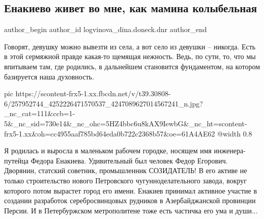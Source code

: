 
 
 
 
 
 
\subsection{Енакиево живет во мне, как мамина колыбельная}
\label{sec:18_11_2021.fb.logvinova_dina.doneck.dnr.1.jenakievo_mamina_kolybeljnaja}
 
\ifcmt
 author_begin
   author_id logvinova_dina.doneck.dnr
 author_end
\fi

Говорят, девушку можно вывезти из села, а вот село из девушки – никогда. Есть в
этой сермяжной правде какая-то щемящая нежность. Ведь, по сути, то, что мы
впитываем там, где родились, в дальнейшем становится фундаментом, на котором
базируется наша духовность. 

\ifcmt
  pic https://scontent-frx5-1.xx.fbcdn.net/v/t39.30808-6/257952744_4252226471570537_4247089627014567241_n.jpg?_nc_cat=111&ccb=1-5&_nc_sid=730e14&_nc_ohc=5HZ4bbc6u8kAX9IewbG&_nc_ht=scontent-frx5-1.xx&oh=cc4955aaf785bd64eda0b722c2368b57&oe=61A4AE62
  @width 0.8
\fi

Я родилась и выросла в маленьком рабочем городке, носящем имя инженера-путейца
Федора Енакиева. Удивительный был человек Федор Егорович. Дворянин, статский
советник, промышленник СОЗИДАТЕЛЬ! В его активе не только строительство нового
Петровского чугунноделательного завода, вокруг которого потом вырастет город
его имени. Енакиев принимал активное участие в создании разработок
серебросвинцовых рудников в Азербайджанской провинции Персии. И в Петербуржском
метрополитене тоже есть частичка его ума и души...

